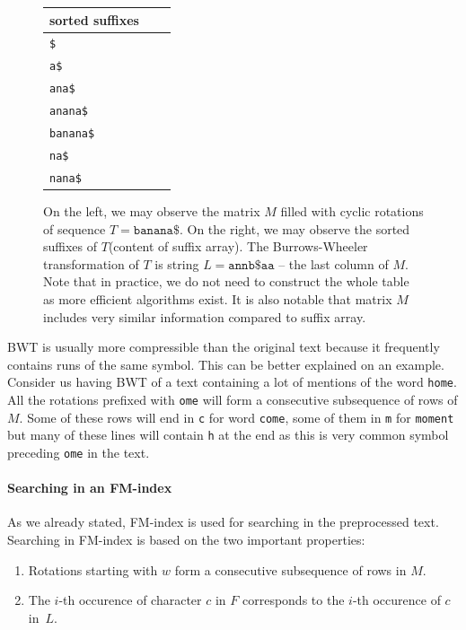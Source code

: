 \begin{figure}
{	\begin{tabular}{l l l}
		sorted suffixes\\
	\hline
		\tt \$ \\
		\tt a\$ \\
		\tt ana\$ \\
		\tt anana\$ \\
		\tt banana\$ \\
		\tt na\$ \\
		\tt nana\$ \\
	\end{tabular}
	}
	\caption[TODO]{On the left, we may observe the matrix $M$ filled with cyclic rotations of sequence
	$T = \mathtt{banana\$}$. On the right, we may observe the sorted suffixes of $T$(content of suffix array). The
	Burrows-Wheeler transformation of $T$ is string $L=\mathtt{annb\$aa}$ -- the last column of $M$.
	Note that in practice, we do not need to construct the whole table as more efficient algorithms exist.
	It is also notable that matrix $M$ includes very similar information compared to suffix array.
	}
	\label{obr:BWT}
\end{figure}

BWT is usually more compressible than the original text because it frequently contains runs of the same
symbol. This can be better explained on an example. Consider us having BWT of a text containing
a lot of mentions of the word {\tt home}. All the rotations prefixed with {\tt ome} will form a
consecutive subsequence of rows of $M$. Some of these rows will end in {\tt c} for word {\tt come},
some of them in {\tt m} for {\tt moment} but many of these lines will contain {\tt h} at the end as this
is very common symbol preceding {\tt ome} in the text.

\paragraph{Searching in an FM-index}

As we already stated, FM-index is used for searching in the preprocessed text.
Searching in FM-index is based on the two important properties:

\begin{enumerate}
	\item Rotations starting with $w$ form a consecutive subsequence of rows in $M$.
	\label{chapter1:fmindexprop:prop1}
	\item The $i$-th occurence of character $c$ in $F$ corresponds to the $i$-th occurence of $c$ in~$L$.
	\label{chapter1:fmindexprop:prop2}
\end{enumerate}

